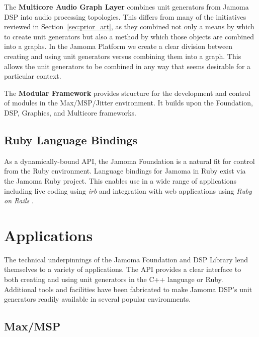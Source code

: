 \documentclass[twoside,10pt]{article}
\begin{document}
The \textbf{Multicore Audio Graph Layer}\cite{web12} combines unit generators from Jamoma DSP into audio processing topologies.  This differs from many of the initiatives reviewed in Section~\ref{sec:prior_art}, as they combined not only a means by which to create unit generators but also a method by which those objects are combined into a graphs.  In the Jamoma Platform we create a clear division between creating and using unit generators versus combining them into a graph.  This allows the unit generators to be combined in any way that seems desirable for a particular context.

The \textbf{Modular Framework}\cite{web13} provides structure for the development and control of modules in the Max/MSP/Jitter environment\cite{Place:2006}.  It builds upon the Foundation, DSP, Graphics, and Multicore frameworks.



\subsection{Ruby Language Bindings} %

As a dynamically-bound API, the Jamoma Foundation is a natural fit for control from the Ruby environment.  Language bindings for Jamoma in Ruby exist via the Jamoma Ruby project\cite{web14}.  This enables use in a wide range of applications including live coding using \emph{irb} \cite{web15} and integration with web applications using \emph{Ruby on Rails} \cite{web16}.




\section{Applications} %

The technical underpinnings of the Jamoma Foundation and DSP Library lend themselves to a variety of applications.  The API provides a clear interface to both creating and using unit generators in the C++ language or Ruby.  Additional tools and facilities have been fabricated to make Jamoma DSP's unit generators readily available in several popular environments.


\subsection{Max/MSP}
\end{document}
